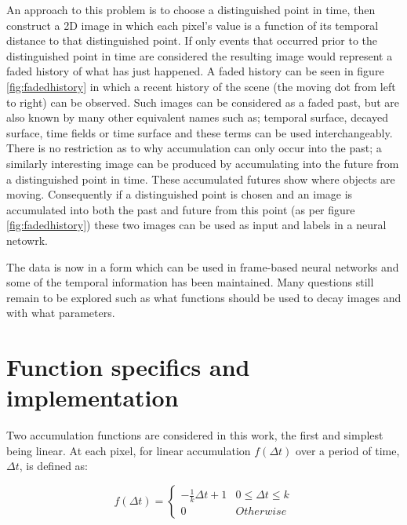 An approach to this problem is to choose a distinguished point in time, then construct a 2D image in which each pixel's value is a function of its temporal distance to that distinguished point.
If only events that occurred prior to the distinguished point in time are considered the resulting image would represent a faded history of what has just happened. 
A faded history can be seen in figure \ref{fig:fadedhistory} in which a recent history of the scene (the moving dot from left to right) can be observed. 
Such images can be considered as a faded past, but are also known by many other equivalent names such as; temporal surface, decayed surface, time fields or time surface and these terms can be used interchangeably. 
There is no restriction as to why accumulation can only occur into the past; a similarly interesting image can be produced by accumulating into the future from a distinguished point in time.
These accumulated futures show where objects are moving. 
Consequently if a distinguished point is chosen and an image is accumulated into both the past and future from this point (as per figure \ref{fig:fadedhistory}) these two images can be used as input and labels in a neural netowrk. 


The data is now in a form which can be used in frame-based neural networks and some of the temporal information has been maintained.
Many questions still remain to be explored such as what functions should be used to decay images and with what parameters.


\section{Function specifics and implementation}

Two accumulation functions are considered in this work, the first and simplest being linear. 
At each pixel, for linear accumulation $f(\Delta t)$ over a period of time, $\Delta t$, is defined as:

\begin{equation}
 \label{eq:linearDecay}
    f(\Delta t) = 
    \begin{cases}
    -\frac{1}{k}  \Delta t + 1 & 0\leq \Delta t \leq k \\
    0 & Otherwise
   \end{cases}
\end{equation}

